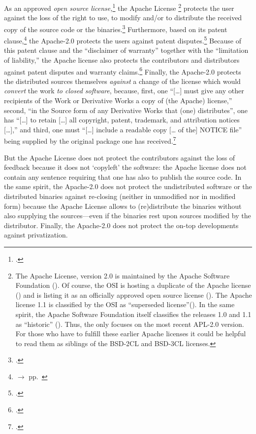 As an approved \emph{open source license,}\footcite[cf.][\nopage wp]{OSI2012b}
the Apache License%
  \footnote{The Apache License, version 2.0 is maintained by the
  Apache Software Foundation (\cite[cf.][\nopage wp]{AsfApacheLicense20a}).  Of
  course, the OSI is hosting a duplicate of the Apache license
  (\cite[cf.][\nopage wp]{Apl20OsiLicense2004a}) and is listing it as an
  officially approved open source license (\cite[cf.][\nopage wp]{OSI2012b}). The
  Apache license 1.1 is classified by the OSI as \enquote{superseded
  license}(\cite[cf.][\nopage wp]{OSI2013b}). In the same spirit, the Apache
  Software Foundation itself classifies the releases 1.0 and 1.1 as
  \enquote{historic} (\cite[cf.][\nopage wp]{AsfLicenses2013a}). Thus, the \oslic{}
  only focuses on the most recent APL-2.0 version. For those who have to fulfill
  these earlier Apache licenses it could be helpful to read them as siblings of
  the BSD-2CL and BSD-3CL licenses.}
protects the user against the loss of the
right to use, to modify and/or to distribute the received copy of the source
code or the binaries.\footcite[cf.][\nopage wp. §2]{Apl20OsiLicense2004a}
Furthermore, based on its patent clause,\footnote{$\rightarrow$ \oslic{} pp.\
} the Apache-2.0 protects the users against patent
disputes.\footcite[cf.][\nopage wp. §3]{Apl20OsiLicense2004a} Because of this
patent clause and the \enquote{disclaimer of warranty} together with the
\enquote{limitation of liability,} the Apache license also protects the
contributors and distributors against patent disputes and warranty
claims.\footcite[cf.][\nopage wp. §3, §7, §8]{Apl20OsiLicense2004a} Finally, the
Apache-2.0 protects the distributed sources themselves \emph{against} a change of the
license which would \emph{convert} the work \emph{to closed software}, because,
first, one \enquote{[\ldots] must give any other recipients of the Work or
Derivative Works a copy of (the Apache) license,} second, \enquote{in the Source
form of any Derivative Works that (one) distributes}, one has \enquote{[\ldots]
to retain [\ldots] all copyright, patent, trademark, and attribution notices
[\ldots],} and third, one must \enquote{[\ldots] include a readable copy [\ldots
of the] NOTICE file} being supplied by the original package one has
received.\footcite[cf.][\nopage wp. §4]{Apl20OsiLicense2004a}

But the Apache License does not protect the contributors against the loss of
feedback because it does not `copyleft' the software: the Apache license does
not contain any sentence requiring that one has also to publish the source code.
In the same spirit, the Apache-2.0 does not protect the undistributed software or the
distributed binaries against re-closing (neither in unmodified nor in
modified form) because the Apache License allows to (re)distribute the
binaries without also supplying the sources---even if the binaries rest upon
sources modified by the distributor. Finally, the Apache-2.0 does not protect the
on-top developments against privatization.


